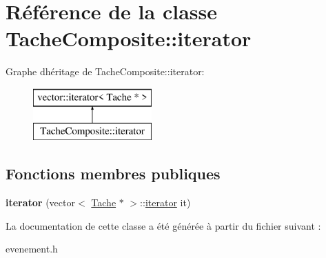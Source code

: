 \hypertarget{class_tache_composite_1_1iterator}{}\section{Référence de la classe Tache\+Composite\+:\+:iterator}
\label{class_tache_composite_1_1iterator}
Graphe d\textquotesingle{}héritage de Tache\+Composite\+:\+:iterator\+:\begin{figure}[H]
\begin{center}
\leavevmode
\includegraphics[height=2.000000cm]{class_tache_composite_1_1iterator}
\end{center}
\end{figure}
\subsection*{Fonctions membres publiques}
\begin{DoxyCompactItemize}
\item 
\hypertarget{class_tache_composite_1_1iterator_af1c995574219e4dd0342bed04b97ebbc}{}{\bfseries iterator} (vector$<$ \hyperlink{class_tache}{Tache} $\ast$ $>$\+::\hyperlink{class_tache_composite_1_1iterator}{iterator} it)\label{class_tache_composite_1_1iterator_af1c995574219e4dd0342bed04b97ebbc}

\end{DoxyCompactItemize}


La documentation de cette classe a été générée à partir du fichier suivant \+:\begin{DoxyCompactItemize}
\item 
evenement.\+h\end{DoxyCompactItemize}
